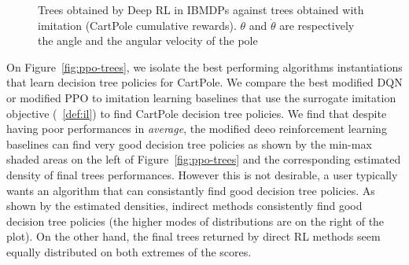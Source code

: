 \begin{figure}[htbp]
    \caption{Trees obtained by Deep RL in IBMDPs against trees obtained with imitation (CartPole cumulative rewards). $\theta$ and $\dot{\theta}$ are respectively the angle and the angular velocity of the pole}
    \label{fig:trees-drl}
\end{figure}


On Figure~\ref{fig:ppo-trees}, we isolate the best performing algorithms instantiations that learn decision tree policies for CartPole.
We compare the best modified DQN or modified PPO to imitation learning baselines that use the surrogate imitation objective (~\ref{def:il}) to find CartPole decision tree policies.
We find that despite having poor performances in \textit{average}, the modified deeo reinforcement learning baselines can find very good decision tree policies as shown by the min-max shaded areas on the left of Figure~\ref{fig:ppo-trees} and the corresponding estimated density of final trees performances.
However this is not desirable, a user typically wants an algorithm that can consistantly find good decision tree policies.
As shown by the estimated densities, indirect methods consistently find good decision tree policies (the higher modes of distributions are on the right of the plot).
On the other hand, the final trees returned by direct RL methods seem equally distributed on both extremes of the scores.

